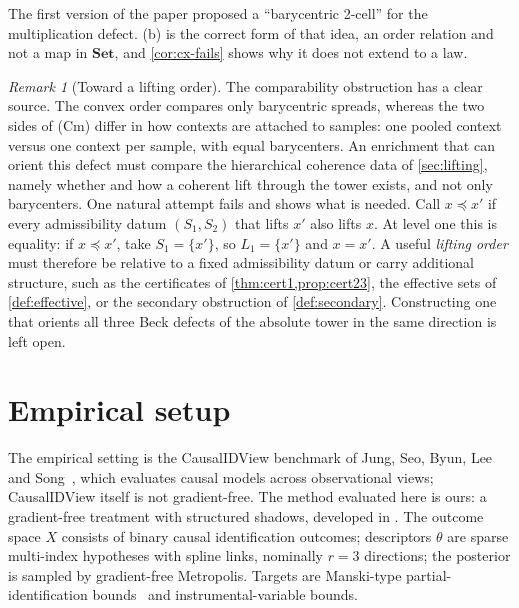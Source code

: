 \documentclass[11pt]{article}
\theoremstyle{definition}
\theoremstyle{remark}
\newtheorem{remark}[theorem]{Remark}
\newcommand{\Set}{\mathbf{Set}}
\begin{document}
The first version of the paper proposed a ``barycentric 2-cell'' for the multiplication defect.
(b) is the correct form of that idea, an order relation and not a map in $\Set$, and
\cref{cor:cx-fails} shows why it does not extend to a law.

\begin{remark}[Toward a lifting order]\label{rem:lift-order}
The comparability obstruction has a clear source. The convex order compares only barycentric
spreads, whereas the two sides of (Cm) differ in how contexts are attached to samples: one pooled
context versus one context per sample, with equal barycenters. An enrichment that can orient this
defect must compare the hierarchical coherence data of \cref{sec:lifting}, namely whether and how a
coherent lift through the tower exists, and not only barycenters. One natural attempt fails and shows
what is needed. Call $x\preceq x'$ if every admissibility datum $(S_1,S_2)$ that lifts $x'$ also lifts
$x$. At level one this is equality: if $x\preceq x'$, take $S_1=\{x'\}$, so $L_1=\{x'\}$ and $x=x'$. A
useful \emph{lifting order} must therefore be relative to a fixed admissibility datum or carry
additional structure, such as the certificates of \cref{thm:cert1,prop:cert23}, the effective sets of
\cref{def:effective}, or the secondary obstruction of \cref{def:secondary}. Constructing one that
orients all three Beck defects of the absolute tower in the same direction is left open.
\end{remark}

\section{Empirical setup}

The empirical setting is the CausalIDView benchmark of Jung, Seo, Byun, Lee and
Song~\cite{Jung2026}, which evaluates causal models across observational views; CausalIDView itself
is not gradient-free. The method evaluated here is ours: a gradient-free treatment with structured
shadows, developed in \cite[Section~51]{Awasthi-ThreeLayers}. The outcome space $X$ consists of binary causal
identification outcomes; descriptors $\theta$ are sparse multi-index hypotheses with spline links,
nominally $r=3$ directions; the posterior is sampled by gradient-free Metropolis. Targets are
Manski-type partial-identification bounds~\cite{Manski1990} and instrumental-variable bounds.
\end{document}
